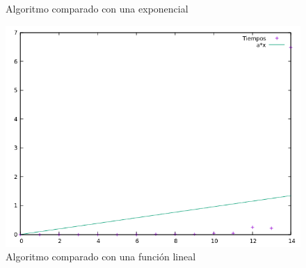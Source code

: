 \documentclass[12pt]{article}
\begin{document}
\begin{figure}[h]
	\caption{Algoritmo comparado con una exponencial}
		\includegraphics[scale=0.5]{../images/lineal_plot.png}
	\caption{Algoritmo comparado con una función lineal}
\end{figure}
\end{document}
